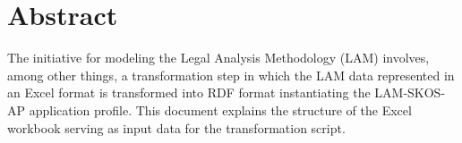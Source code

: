 \section*{Abstract}

The initiative for modeling the Legal Analysis Methodology (LAM) involves, among other things, a transformation step in which the LAM data represented in an Excel format is transformed into RDF format instantiating the LAM-SKOS-AP application profile. This document explains the structure of the Excel workbook serving as input data for the transformation script.